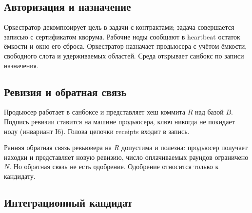 \subsection{Авторизация и назначение}

Оркестратор декомпозирует цель в задачи с контрактами; задача совершается записью с сертификатом кворума. Рабочие ноды сообщают в heartbeat остаток ёмкости и окно его сброса. Оркестратор назначает продьюсера с учётом ёмкости, свободного слота и удерживаемых областей. Среда открывает санбокс по записи назначения.

\subsection{Ревизия и обратная связь}

Продьюсер работает в санбоксе и представляет хеш коммита $R$ над базой $B$. Подпись ревизии ставится на машине продьюсера, ключ никогда не покидает ноду (инвариант I6). Голова цепочки receipts входит в запись.

Ранняя обратная связь ревьювера на $R$ допустима и полезна: продьюсер получает находки и представляет новую ревизию, число оплачиваемых раундов ограничено $N$. Но обратная связь не есть одобрение. Одобрение относится только к кандидату.

\subsection{Интеграционный кандидат}

\begin{center}
\end{center}

